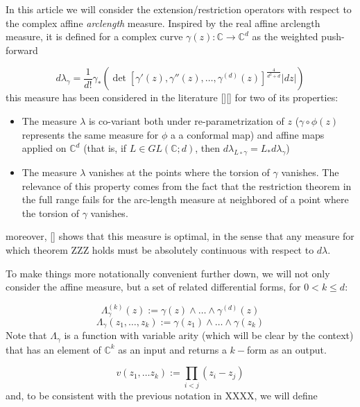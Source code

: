 	In this article we will consider the extension/restriction operators with respect to the complex affine \textit{arclength} measure. Inspired by the real affine arclength measure, it is defined for a complex curve $\gamma(z):\mathbb C \to \mathbb C^d$ as the weighted push-forward

	\begin{equation}
		d \lambda_\gamma = \frac 1 {d!}  \gamma_* \left(\det [\gamma'(z), \gamma''(z), \dots ,\gamma^{(d)}(z)]^{\frac{4}{d^2+d}} |dz|\right)
	\end{equation}
	this measure has been considered in the literature [][] for two of its properties:

	\begin{itemize}
		\item The measure $\lambda$ is co-variant both under re-parametrization of $z$ ($\gamma\circ\phi(z)$ represents the same measure for $\phi$ a a conformal map) and affine maps applied on $\mathbb C^d$ (that is, if $L \in GL(\mathbb C;d)$, then $d\lambda_{L\circ\gamma} = L_* d\lambda_\gamma$)
		\item The measure $\lambda$ vanishes at the points where the torsion of $\gamma$ vanishes. The relevance of this property comes from the fact that the restriction theorem in the full range fails for the arc-length measure at neighbored of a point where the torsion of $\gamma$ vanishes.
	\end{itemize}

	moreover, [] shows that this measure is optimal, in the sense that any measure for which theorem ZZZ holds must be absolutely continuous with respect to $d\lambda$.

	To make things more notationally convenient further down, we will not only consider the  affine measure, but a set of related differential forms, for $0<k\le d$:

	\begin{equation}
		\Lambda^{(k)}_\gamma(z) := \gamma(z)\wedge  \dots \wedge \gamma^{(d)}(z)
	\end{equation}
	\begin{equation}
		\Lambda_\gamma(z_1, \dots , z_k) := \gamma(z_1)\wedge\dots\wedge \gamma(z_k)
	\end{equation}
	Note that $\Lambda_\gamma$ is a function with variable arity (which will be clear by the context) that has an element of $\mathbb C^k$ as an input and returns a $k-$form as an output.

	\begin{equation}
		v(z_1, \dots z_k) := \prod_{i<j} (z_i-z_j)
	\end{equation}
	and, to be consistent with the previous notation in XXXX, we will define 

